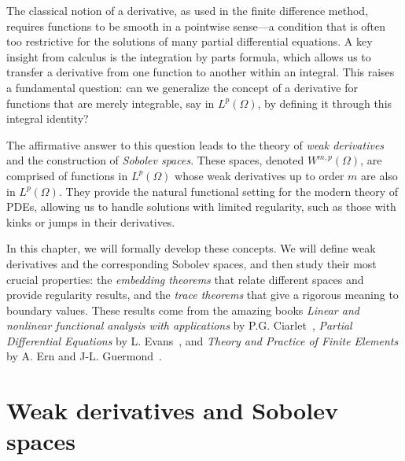 The classical notion of a derivative, as used in the finite difference method, requires functions to be smooth in a pointwise sense---a condition that is often too restrictive for the solutions of many partial differential equations. A key insight from calculus is the integration by parts formula, which allows us to transfer a derivative from one function to another within an integral. This raises a fundamental question: can we generalize the concept of a derivative for functions that are merely integrable, say in $L^p(\Omega)$, by defining it through this integral identity?

The affirmative answer to this question leads to the theory of \emph{weak derivatives} and the construction of \emph{Sobolev spaces}. These spaces, denoted $W^{m,p}(\Omega)$, are comprised of functions in $L^p(\Omega)$ whose weak derivatives up to order $m$ are also in $L^p(\Omega)$. They provide the natural functional setting for the modern theory of PDEs, allowing us to handle solutions with limited regularity, such as those with kinks or jumps in their derivatives.

In this chapter, we will formally develop these concepts. We will define weak derivatives and the corresponding Sobolev spaces, and then study their most crucial properties: the \emph{embedding theorems} that relate different spaces and provide regularity results, and the \emph{trace theorems} that give a rigorous meaning to boundary values. These results come from the amazing books \emph{Linear and nonlinear functional analysis with applications} by P.G. Ciarlet~\cite{ciarlet2013linear}, \emph{Partial Differential Equations} by L. Evans~\cite{evans2022partial}, and \emph{Theory and Practice of Finite Elements} by A. Ern and J-L. Guermond~\cite{ern2004theory}.
\section{Weak derivatives and Sobolev spaces}\label{sec:weak-derivatives-sobolev-spaces}
